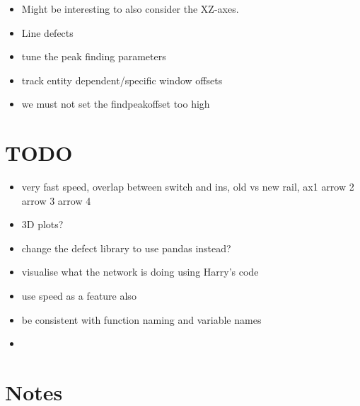 \begin{itemize}
	\item Might be interesting to also consider the XZ-axes.
	\item Line defects
	\item tune the peak finding parameters
	\item track entity dependent/specific window offsets
	\item we must not set the findpeakoffset too high
\end{itemize}

\newpage
\section{TODO}
\begin{itemize}
	\item very fast speed, overlap between switch and ins, old vs new rail, ax1 arrow 2 arrow 3 arrow 4
	\item 3D plots?
	\item change the defect library to use pandas instead?
	\item visualise what the network is doing using Harry's code
	\item use speed as a feature also
	\item be consistent with function naming and variable names
	\item 
\end{itemize}


\newpage
\section{Notes}


